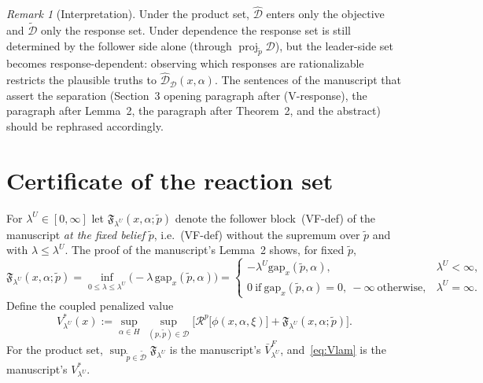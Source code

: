 \documentclass[11pt]{article}
\theoremstyle{definition}
\theoremstyle{remark}
\newtheorem{remark}{Remark}
\newcommand{\D}{\mathcal{D}}
\newcommand{\Dh}{\hat{\mathcal{D}}}
\newcommand{\Dt}{\tilde{\mathcal{D}}}
\newcommand{\tp}{\tilde{p}}
\newcommand{\R}{\mathcal{R}}
\newcommand{\gap}{\mathrm{gap}}
\DeclareMathOperator{\proj}{proj}
\begin{document}
\begin{remark}[Interpretation]
Under the product set, $\Dh$ enters only the objective and $\Dt$ only the response set. Under dependence the response set is still determined by the follower side alone (through $\proj_{\tp}\D$), but the leader-side set becomes response-dependent: observing which responses are rationalizable restricts the plausible truths to $\Dh_\D(x,\alpha)$. The sentences of the manuscript that assert the separation (Section~3 opening paragraph after (V-response), the paragraph after Lemma~2, the paragraph after Theorem~2, and the abstract) should be rephrased accordingly.
\end{remark}

\section{Certificate of the reaction set}

For $\lambda^U\in[0,\infty]$ let $\mathfrak F_{\lambda^U}(x,\alpha;\tp)$ denote the follower block~(VF-def) of the manuscript \emph{at the fixed belief} $\tp$, i.e.\ (VF-def) without the supremum over $\tp$ and with $\lambda\le\lambda^U$. The proof of the manuscript's Lemma~2 shows, for fixed $\tp$,
\begin{equation}\label{eq:F-fixed}
  \mathfrak F_{\lambda^U}(x,\alpha;\tp)=\inf_{0\le\lambda\le\lambda^U}\big(-\lambda\,\gap_x(\tp,\alpha)\big)
  =\begin{cases}-\lambda^U\gap_x(\tp,\alpha),&\lambda^U<\infty,\\ 0\ \text{if}\ \gap_x(\tp,\alpha)=0,\ -\infty\ \text{otherwise},&\lambda^U=\infty.\end{cases}
\end{equation}
Define the coupled penalized value
\begin{equation}\label{eq:Vlam}
  V^*_{\lambda^U}(x):=\sup_{\alpha\in H}\ \sup_{(p,\tp)\in\D}\Big[\R^p\big[\phi(x,\alpha,\xi)\big]+\mathfrak F_{\lambda^U}(x,\alpha;\tp)\Big].
\end{equation}
For the product set, $\sup_{\tp\in\Dt}\mathfrak F_{\lambda^U}$ is the manuscript's $\bar V^F_{\lambda^U}$, and~\eqref{eq:Vlam} is the manuscript's $V^*_{\lambda^U}$.
\end{document}

